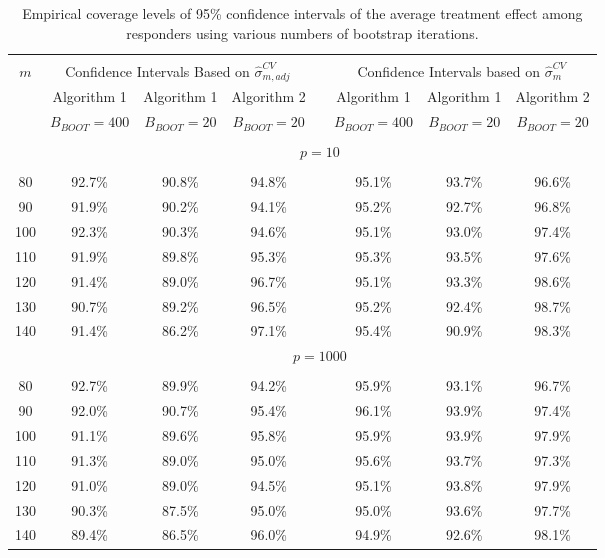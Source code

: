 \documentclass[12pt]{article}
\begin{document}
\begin{table}[ht]{
\centering
\setlength{\tabcolsep}{3pt}
\renewcommand{\arraystretch}{0.5}
\begin{tabular}{ cccccccc }
\hline\\
$m$   & \multicolumn{3}{c}{Confidence Intervals Based on $\widehat{\sigma}_{m,adj}^{CV}$} &&  \multicolumn{3}{c}{Confidence Intervals based on $\widehat{\sigma}_m^{CV}$}\\
    & Algorithm 1 & Algorithm 1 & Algorithm 2 && Algorithm 1 & Algorithm 1 & Algorithm 2\\ 
    & $B_{BOOT}=400$  & $B_{BOOT}=20$  & $B_{BOOT}=20$  && $B_{BOOT}=400$  & $B_{BOOT}=20$ & $B_{BOOT}=20$\\
        \cline{2-4} \cline{6-8}\\
         & \multicolumn{7}{c}{$p = 10$} \\
         \cline{2-8}\\
80   & 92.7\% & 90.8\% & 94.8\% && 95.1\% & 93.7\% & 96.6\%\\
90   & 91.9\% & 90.2\% & 94.1\% && 95.2\% & 92.7\% & 96.8\%\\
100  & 92.3\% & 90.3\% & 94.6\% && 95.1\% & 93.0\% & 97.4\%\\
110  & 91.9\% & 89.8\% & 95.3\% && 95.3\% & 93.5\% & 97.6\%\\
120  & 91.4\% & 89.0\% & 96.7\% && 95.1\% & 93.3\% & 98.6\%\\
130  & 90.7\% & 89.2\% & 96.5\% && 95.2\% & 92.4\% & 98.7\%\\
140  & 91.4\% & 86.2\% & 97.1\% && 95.4\% & 90.9\% & 98.3\%\\

   & \multicolumn{7}{c}{$p = 1000$} \\
   \cline{2-8}\\
80  &  92.7\% & 89.9\% & 94.2\% && 95.9\% & 93.1\% & 96.7\%\\
90  &  92.0\% & 90.7\% & 95.4\% && 96.1\% & 93.9\% & 97.4\%\\
100 &  91.1\% & 89.6\% & 95.8\% && 95.9\% & 93.9\% & 97.9\%\\
110 &  91.3\% & 89.0\% & 95.0\% && 95.6\% & 93.7\% & 97.3\%\\
120 &  91.0\% & 89.0\% & 94.5\% && 95.1\% & 93.8\% & 97.9\%\\
130 &  90.3\% & 87.5\% & 95.0\% && 95.0\% & 93.6\% & 97.7\%\\
140 &  89.4\% & 86.5\% & 96.0\% && 94.9\% & 92.6\% & 98.1\%
\end{tabular}
\caption{Empirical coverage levels of 95\% confidence intervals of the average treatment effect among responders using various numbers of bootstrap iterations.} \label{tab:simupmsmall}}
\end{table} 
\end{document}
